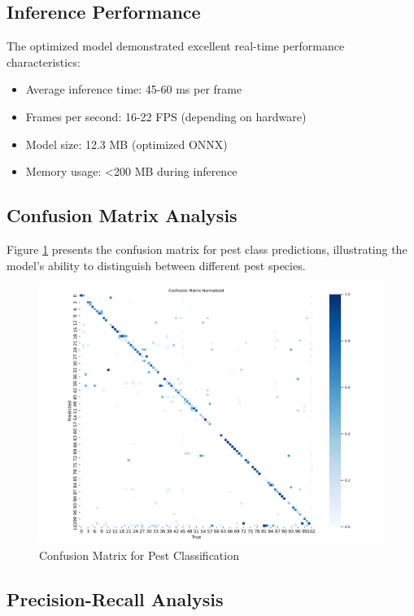 \documentclass[conference]{IEEEtran}
\begin{document}
\subsection{Inference Performance}

The optimized model demonstrated excellent real-time performance characteristics:
\begin{itemize}
\item Average inference time: 45-60 ms per frame
\item Frames per second: 16-22 FPS (depending on hardware)
\item Model size: 12.3 MB (optimized ONNX)
\item Memory usage: <200 MB during inference
\end{itemize}

\subsection{Confusion Matrix Analysis}

Figure \ref{fig:confusion_matrix} presents the confusion matrix for pest class predictions, illustrating the model's ability to distinguish between different pest species.

\begin{figure}[htbp]
\centerline{\includegraphics[width=\columnwidth]{confusion_matrix.png}}
\caption{Confusion Matrix for Pest Classification}
\label{fig:confusion_matrix}
\end{figure}

\subsection{Precision-Recall Analysis}
\end{document}
